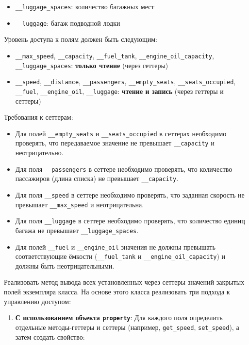 \begin{enumerate}
\begin{itemize}
    \item \texttt{\_\_luggage\_spaces}: количество багажных мест  
    \item \texttt{\_\_luggage}: багаж подводной лодки  
\end{itemize}
Уровень доступа к полям должен быть следующим:
\begin{itemize}
    \item \texttt{\_\_max\_speed}, \texttt{\_\_capacity}, \texttt{\_\_fuel\_tank}, \texttt{\_\_engine\_oil\_capacity}, \texttt{\_\_luggage\_spaces}: \textbf{только чтение} (через геттеры)  
    \item \texttt{\_\_speed}, \texttt{\_\_distance}, \texttt{\_\_passengers}, \texttt{\_\_empty\_seats}, \texttt{\_\_seats\_occupied}, \texttt{\_\_fuel}, \texttt{\_\_engine\_oil}, \texttt{\_\_luggage}: \textbf{чтение и запись} (через геттеры и сеттеры)
\end{itemize}
Требования к сеттерам:
\begin{itemize}
    \item Для полей \texttt{\_\_empty\_seats} и \texttt{\_\_seats\_occupied} в сеттерах необходимо проверять, что передаваемое значение не превышает \texttt{\_\_capacity} и неотрицательно.  
    \item Для поля \texttt{\_\_passengers} в сеттере необходимо проверять, что количество пассажиров (длина списка) не превышает \texttt{\_\_capacity}.  
    \item Для поля \texttt{\_\_speed} в сеттере необходимо проверять, что заданная скорость не превышает \texttt{\_\_max\_speed} и неотрицательна.  
    \item Для поля \texttt{\_\_luggage} в сеттере необходимо проверять, что количество единиц багажа не превышает \texttt{\_\_luggage\_spaces}.
    \item Для полей \texttt{\_\_fuel} и \texttt{\_\_engine\_oil} значения не должны превышать соответствующие ёмкости (\texttt{\_\_fuel\_tank} и \texttt{\_\_engine\_oil\_capacity}) и должны быть неотрицательными.
\end{itemize}
Реализовать метод вывода всех установленных через сеттеры значений закрытых полей экземпляра класса.
На основе этого класса реализовать три подхода к управлению доступом:
\begin{enumerate}
    \item \textbf{С использованием объекта \texttt{property}}:  
    Для каждого поля определить отдельные методы-геттеры и сеттеры (например, \texttt{get\_speed}, \texttt{set\_speed}), а затем создать свойство:  

\end{enumerate}
\end{enumerate}
